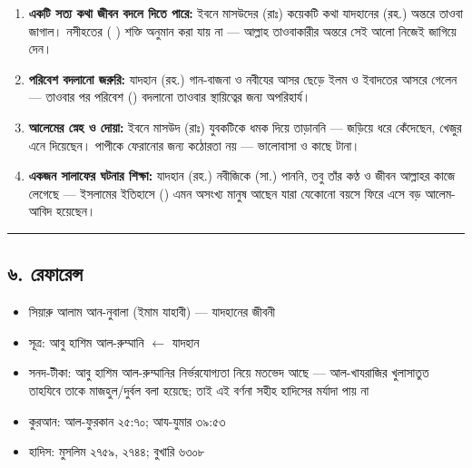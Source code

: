\begin{enumerate}
\item \textbf{একটি সত্য কথা জীবন বদলে দিতে পারে:} ইবনে মাসউদের (রাঃ) কয়েকটি কথা যাদহানের (রহ.) অন্তরে তাওবা জাগাল। নসীহতের ( ) শক্তি অনুমান করা যায় না — আল্লাহ তাওবাকারীর অন্তরে সেই আলো নিজেই জাগিয়ে দেন।
\item \textbf{পরিবেশ বদলানো জরুরি:} যাদহান (রহ.) গান-বাজনা ও নবীযের আসর ছেড়ে ইলম ও ইবাদতের আসরে গেলেন — তাওবার পর পরিবেশ () বদলানো তাওবার স্থায়িত্বের জন্য অপরিহার্য।
\item \textbf{আলেমের স্নেহ ও দোয়া:} ইবনে মাসউদ (রাঃ) যুবকটিকে ধমক দিয়ে তাড়াননি — জড়িয়ে ধরে কেঁদেছেন, খেজুর এনে দিয়েছেন। পাপীকে ফেরানোর জন্য কঠোরতা নয় — ভালোবাসা ও কাছে টানা।
\item \textbf{একজন সালাফের ঘটনার শিক্ষা:} যাদহান (রহ.) নবীজিকে (সা.) পাননি, তবু তাঁর কণ্ঠ ও জীবন আল্লাহর কাজে লেগেছে — ইসলামের ইতিহাসে () এমন অসংখ্য মানুষ আছেন যারা যেকোনো বয়সে ফিরে এসে বড় আলেম-আবিদ হয়েছেন।
\end{enumerate}
\medskip\hrule\medskip

\subsection*{৬. রেফারেন্স}

\begin{itemize}
\item সিয়ারু আলাম আন-নুবালা (ইমাম যাহাবী) — যাদহানের জীবনী
\item সূত্র: আবু হাশিম আল-রুম্মানি $\leftarrow$ যাদহান
\item সনদ-টীকা: আবু হাশিম আল-রুম্মানির নির্ভরযোগ্যতা নিয়ে মতভেদ আছে — আল-খাযরাজির খুলাসাতুত তাহযিবে তাকে মাজহুল/দুর্বল বলা হয়েছে; তাই এই বর্ণনা সহীহ হাদিসের মর্যাদা পায় না
\item কুরআন: আল-ফুরকান ২৫:৭০; আয-যুমার ৩৯:৫৩
\item হাদিস: মুসলিম ২৭৫৯, ২৭৪৪; বুখারি ৬৩০৮
\end{itemize}


